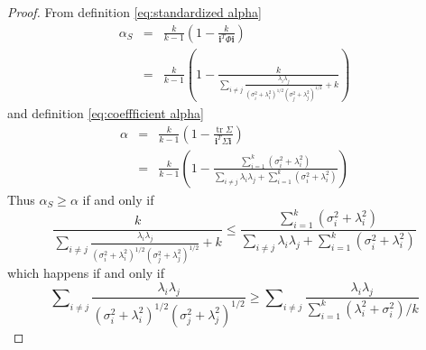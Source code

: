 \documentclass[twoside]{article}
\DeclareMathOperator{\tr}{tr}
\DeclareMathOperator{\tsum}{\textstyle \sum}
\renewcommand{\sqrt}[1]{{(#1)^{1/2}}}
\begin{document}
\begin{proof}
From definition \eqref{eq:standardized alpha}
\begin{eqnarray*}
\alpha_S & = & \frac{k}{k-1}\left(1-\frac{k}{\mathbf{i}^{T}\Phi\mathbf{i}}\right)\\
 & = & \frac{k}{k-1}\left(1-\frac{k}{\tsum_{i\neq j}\frac{\lambda_{i}\lambda_{j}}{\sqrt{\sigma_{i}^{2}+\lambda_{i}^{2}}\sqrt{\sigma_{j}^{2}+\lambda_{j}^{2}}}+k}\right)
\end{eqnarray*}
and definition \eqref{eq:coeffficient alpha}
\begin{eqnarray*}
\alpha & = & \frac{k}{k-1}\left(1-\frac{\tr\Sigma}{\mathbf{i}^{T}\Sigma\mathbf{i}}\right)\\
 & = & \frac{k}{k-1}\left(1-\frac{\tsum_{i=1}^{k}(\sigma_{i}^{2}+\lambda_{i}^{2})}{\tsum_{i\neq j}\lambda_{i}\lambda_{j}+\tsum_{i=1}^{k}(\sigma_{i}^{2}+\lambda_{i}^{2})}\right)
\end{eqnarray*}
Thus $\alpha_S\geq\alpha$ if and only if
\[
\frac{k}{\tsum_{i\neq j}\frac{\lambda_{i}\lambda_{j}}{\sqrt{\sigma_{i}^{2}+\lambda_{i}^{2}}\sqrt{\sigma_{j}^{2}+\lambda_{j}^{2}}}+k}\leq\frac{\tsum_{i=1}^{k}(\sigma_{i}^{2}+\lambda_{i}^{2})}{\tsum_{i\neq j}\lambda_{i}\lambda_{j}+\tsum_{i=1}^{k}(\sigma_{i}^{2}+\lambda_{i}^{2})}
\]
which happens if and only if 
\[
\tsum_{i\neq j}\frac{\lambda_{i}\lambda_{j}}{\sqrt{\sigma_{i}^{2}+\lambda_{i}^{2}}\sqrt{\sigma_j^{2}+\lambda_{j}^{2}}}\geq\tsum_{i\neq j}\frac{\lambda_{i}\lambda_{j}}{\tsum_{i=1}^{k}(\lambda_{i}^{2}+\sigma_{i}^{2})/k}
\]
\end{proof}
\end{document}
